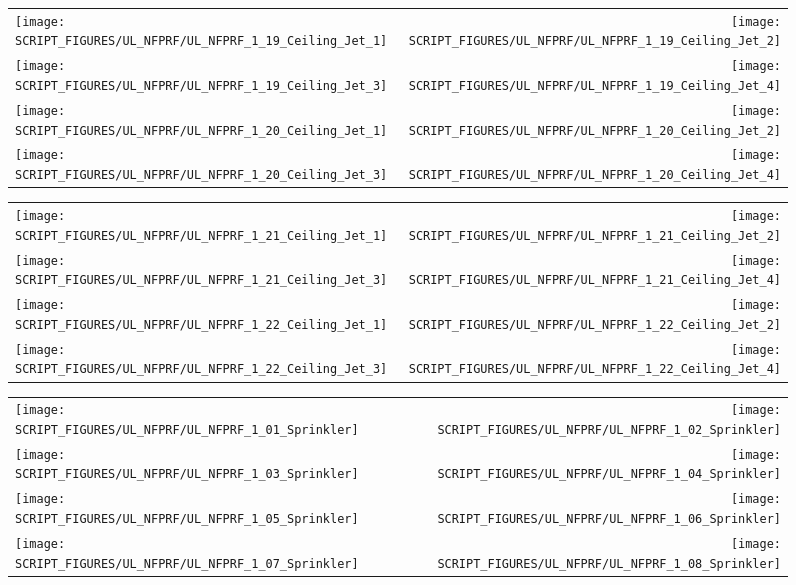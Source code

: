 \begin{figure}[p]
\begin{tabular*}{\textwidth}{l@{\extracolsep{\fill}}r}
\texttt{[image: SCRIPT\_FIGURES/UL\_NFPRF/UL\_NFPRF\_1\_19\_Ceiling\_Jet\_1]} &
\texttt{[image: SCRIPT\_FIGURES/UL\_NFPRF/UL\_NFPRF\_1\_19\_Ceiling\_Jet\_2]} \\
\texttt{[image: SCRIPT\_FIGURES/UL\_NFPRF/UL\_NFPRF\_1\_19\_Ceiling\_Jet\_3]} &
\texttt{[image: SCRIPT\_FIGURES/UL\_NFPRF/UL\_NFPRF\_1\_19\_Ceiling\_Jet\_4]} \\
\texttt{[image: SCRIPT\_FIGURES/UL\_NFPRF/UL\_NFPRF\_1\_20\_Ceiling\_Jet\_1]} &
\texttt{[image: SCRIPT\_FIGURES/UL\_NFPRF/UL\_NFPRF\_1\_20\_Ceiling\_Jet\_2]} \\
\texttt{[image: SCRIPT\_FIGURES/UL\_NFPRF/UL\_NFPRF\_1\_20\_Ceiling\_Jet\_3]} &
\texttt{[image: SCRIPT\_FIGURES/UL\_NFPRF/UL\_NFPRF\_1\_20\_Ceiling\_Jet\_4]}
\end{tabular*}
\end{figure}

\begin{figure}[p]
\begin{tabular*}{\textwidth}{l@{\extracolsep{\fill}}r}
\texttt{[image: SCRIPT\_FIGURES/UL\_NFPRF/UL\_NFPRF\_1\_21\_Ceiling\_Jet\_1]} &
\texttt{[image: SCRIPT\_FIGURES/UL\_NFPRF/UL\_NFPRF\_1\_21\_Ceiling\_Jet\_2]} \\
\texttt{[image: SCRIPT\_FIGURES/UL\_NFPRF/UL\_NFPRF\_1\_21\_Ceiling\_Jet\_3]} &
\texttt{[image: SCRIPT\_FIGURES/UL\_NFPRF/UL\_NFPRF\_1\_21\_Ceiling\_Jet\_4]} \\
\texttt{[image: SCRIPT\_FIGURES/UL\_NFPRF/UL\_NFPRF\_1\_22\_Ceiling\_Jet\_1]} &
\texttt{[image: SCRIPT\_FIGURES/UL\_NFPRF/UL\_NFPRF\_1\_22\_Ceiling\_Jet\_2]} \\
\texttt{[image: SCRIPT\_FIGURES/UL\_NFPRF/UL\_NFPRF\_1\_22\_Ceiling\_Jet\_3]} &
\texttt{[image: SCRIPT\_FIGURES/UL\_NFPRF/UL\_NFPRF\_1\_22\_Ceiling\_Jet\_4]}
\end{tabular*}
\end{figure}

\begin{figure}[p]
\begin{tabular*}{\textwidth}{l@{\extracolsep{\fill}}r}
\texttt{[image: SCRIPT\_FIGURES/UL\_NFPRF/UL\_NFPRF\_1\_01\_Sprinkler]} &
\texttt{[image: SCRIPT\_FIGURES/UL\_NFPRF/UL\_NFPRF\_1\_02\_Sprinkler]} \\
\texttt{[image: SCRIPT\_FIGURES/UL\_NFPRF/UL\_NFPRF\_1\_03\_Sprinkler]} &
\texttt{[image: SCRIPT\_FIGURES/UL\_NFPRF/UL\_NFPRF\_1\_04\_Sprinkler]} \\
\texttt{[image: SCRIPT\_FIGURES/UL\_NFPRF/UL\_NFPRF\_1\_05\_Sprinkler]} &
\texttt{[image: SCRIPT\_FIGURES/UL\_NFPRF/UL\_NFPRF\_1\_06\_Sprinkler]} \\
\texttt{[image: SCRIPT\_FIGURES/UL\_NFPRF/UL\_NFPRF\_1\_07\_Sprinkler]} &
\texttt{[image: SCRIPT\_FIGURES/UL\_NFPRF/UL\_NFPRF\_1\_08\_Sprinkler]}
\end{tabular*}
\end{figure}

